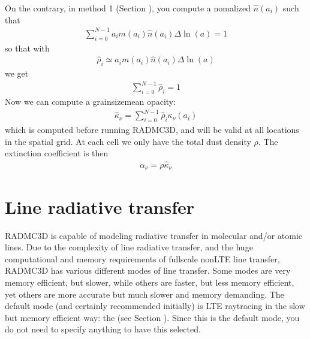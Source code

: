 \documentclass[letterpaper,10pt,english]{sphinxmanual}
\begin{document}
On the contrary, in method 1 (Section {\hyperref[\detokenize{dustradtrans:sec-grain-size-distributions-method-1}]{}}), you compute
a nomalized \(\hat n(a_i)\) such that
\begin{equation*}
\begin{split}\sum_{i=0}^{N-1}  a_i m(a_i)\hat n(a_i)\Delta\ln(a) = 1\end{split}
\end{equation*}
so that with
\begin{equation*}
\begin{split}\hat\rho_i \simeq a_i m(a_i)\hat n(a_i)\Delta\ln(a)\end{split}
\end{equation*}
we get
\begin{equation*}
\begin{split}\sum_{i=0}^{N-1}  \hat\rho_i = 1\end{split}
\end{equation*}
Now we can compute a grain\sphinxhyphen{}size\sphinxhyphen{}mean opacity:
\begin{equation*}
\begin{split}\hat\kappa_\nu = \sum_{i=0}^{N-1} \hat\rho_i\kappa_\nu(a_i)\end{split}
\end{equation*}
which is computed before running RADMC\sphinxhyphen{}3D, and will be valid at all locations in the spatial grid.
At each cell we only have the total dust density \(\rho\). The extinction coefficient is
then
\begin{equation*}
\begin{split}\alpha_\nu = \rho\hat\kappa_\nu\end{split}
\end{equation*}

\chapter{Line radiative transfer}
\label{\detokenize{lineradtrans:line-radiative-transfer}}\label{\detokenize{lineradtrans:chap-line-transfer}}\label{\detokenize{lineradtrans::doc}}
RADMC\sphinxhyphen{}3D is capable of modeling radiative transfer in molecular and/or
atomic lines. Due to the complexity of line radiative transfer, and the huge
computational and memory requirements of full\sphinxhyphen{}scale non\sphinxhyphen{}LTE line transfer,
RADMC\sphinxhyphen{}3D has various different modes of line transfer. Some modes are very
memory efficient, but slower, while others are faster, but less memory
efficient, yet others are more accurate but much slower and memory
demanding. The default mode (and certainly recommended initially) is LTE
ray\sphinxhyphen{}tracing in the slow but memory efficient way: the 
(see Section {\hyperref[\detokenize{lineradtrans:sec-line-trans-modes}]{}}). Since this is the default mode,
you do not need to specify anything to have this selected.
\end{document}
